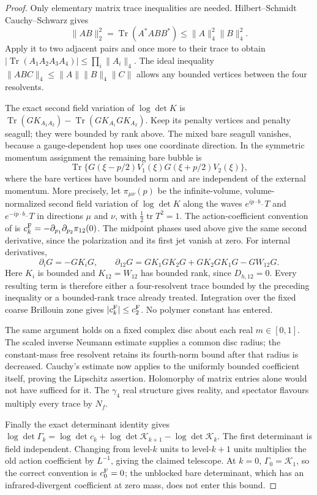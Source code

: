 \documentclass[11pt,letterpaper,reqno]{amsart}
\theoremstyle{definition}
\theoremstyle{remark}
\begin{document}
\begin{proof}
Only elementary matrix trace inequalities are
needed.  Hilbert--Schmidt Cauchy--Schwarz gives
\[
 \|AB\|_2^2=\operatorname{Tr}(A^*ABB^*)
          \le\|A\|_4^2\|B\|_4^2.
\]
Apply it to two adjacent pairs and once more
to their trace to obtain
$|\operatorname{Tr}(A_1A_2A_3A_4)|
\le\prod_i\|A_i\|_4$.  The ideal inequality
$\|ABC\|_4\le\|A\|\|B\|_4\|C\|$
allows any bounded vertices between the four
resolvents.

The exact second field variation of $\log\det K$
is $\operatorname{Tr}(GK_{A_1A_2})-
\operatorname{Tr}(GK_{A_1}GK_{A_2})$.
Keep its penalty vertices and penalty seagull;
they were bounded by rank above.  The mixed
bare seagull vanishes, because a gauge-dependent
hop uses one coordinate direction.  In the
symmetric momentum assignment the remaining
bare bubble is
\[
 \operatorname{Tr}\{G(\xi-p/2)V_1(\xi)
                           G(\xi+p/2)V_2(\xi)\},
\]
where the bare vertices have bounded norm and
are independent of the external momentum.
More precisely, let $\pi_{\mu\nu}(p)$ be the infinite-volume,
volume-normalized second field variation of $\log\det K$ along
the waves $e^{ip\cdot b_-}T$ and $e^{-ip\cdot b_-}T$ in
directions $\mu$ and $\nu$, with $\tfrac12\operatorname{tr}T^2=1$.
The action-coefficient convention of \cite[Section~43]{YMM1} is
$c_k^{\rm F}=-\partial_{p_1}\partial_{p_2}\pi_{12}(0)$.
The midpoint phases used above give the same second derivative,
since the polarization and its first jet vanish at zero.
For internal derivatives,
\[
 \partial_iG=-GK_iG,\qquad
 \partial_{12}G=GK_1GK_2G+GK_2GK_1G-GW_{12}G.
\]
Here $K_i$ is bounded and $K_{12}=W_{12}$ has
bounded rank, since $D_{h,12}=0$.
Every resulting term is therefore either a
four-resolvent trace bounded by the preceding
inequality or a bounded-rank trace already
treated.  Integration over the fixed coarse
Brillouin zone gives $|c_k^{\rm F}|\le c_2^{\rm F}$.
No polymer constant has entered.

The same argument holds on a fixed complex
disc about each real $m\in[0,1]$.  The scaled
inverse Neumann estimate supplies a common
disc radius; the constant-mass free resolvent
retains its fourth-norm bound after that
radius is decreased.  Cauchy's estimate now
applies to the uniformly bounded coefficient
itself, proving the Lipschitz assertion.
Holomorphy of matrix entries alone would not
have sufficed for it.  The $\gamma_4$ real
structure gives reality, and spectator
flavours multiply every trace by $N_f$.

Finally the exact determinant identity gives
$\log\det\Gamma_k=\log\det c_k+
\log\det\mathcal K_{k+1}-\log\det\mathcal K_k$.
The first determinant is field independent.
Changing from level-$k$ units to level-$k+1$
units multiplies the old action coefficient
by $L^{-1}$, giving the claimed telescope.
At $k=0$, $\Gamma_0=\mathcal K_1$, so the
correct convention is $c_0^{\rm F}=0$;
the unblocked bare determinant, which has
an infrared-divergent coefficient at zero
mass, does not enter this bound.
\end{proof}
\end{document}
